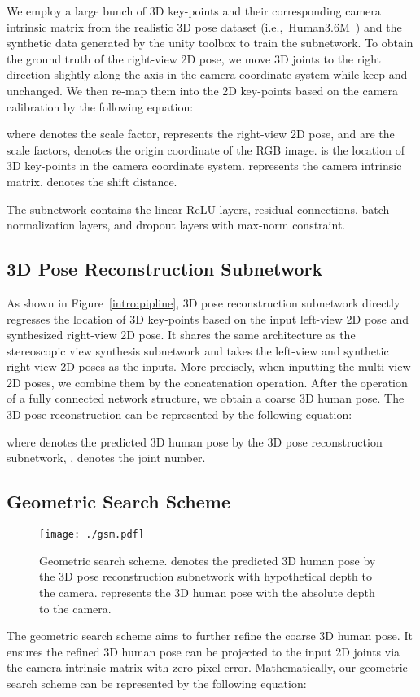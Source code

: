 \documentclass[10pt,twocolumn,letterpaper]{article}
\def\ie{i.e.,~}
\begin{document}
We employ a large bunch of 3D key-points and their corresponding camera intrinsic matrix from the realistic 3D pose dataset (\ie Human3.6M~\cite{h36m_pami}) and the synthetic data generated by the unity toolbox to train the subnetwork.
To obtain the ground truth of the right-view 2D pose, we move 3D joints to the right direction slightly along the  axis in the camera coordinate system while keep  and  unchanged. We then re-map them into the 2D key-points based on the camera calibration by the following equation:

where  denotes the scale factor,  represents the right-view 2D pose,  and  are the scale factors,  denotes the origin coordinate of the RGB image.  is the location of 3D key-points in the camera coordinate system.  represents the camera intrinsic matrix.  denotes the shift distance. 

The subnetwork contains the linear-ReLU layers, residual connections, batch normalization layers, and dropout layers with max-norm constraint.
\subsection{3D Pose Reconstruction Subnetwork}
As shown in Figure~\ref{intro:pipline}, 3D pose reconstruction subnetwork directly regresses the location of 3D key-points based on the input left-view 2D pose and synthesized right-view 2D pose.
It shares the same architecture as the stereoscopic view synthesis subnetwork and takes the left-view and synthetic right-view 2D poses as the inputs.
More precisely, when inputting the multi-view 2D poses, we combine them by the concatenation operation.
After the operation of a fully connected network structure, we obtain a coarse 3D human pose.
The 3D pose reconstruction can be represented by the following equation:

where  denotes the predicted 3D human pose by the 3D pose reconstruction subnetwork, ,  denotes the joint number. 
\subsection{Geometric Search Scheme}

\begin{figure}[t]
\footnotesize
\centering
\texttt{[image: ./gsm.pdf]}
\vspace{-2mm}
\caption{Geometric search scheme.  denotes the predicted 3D human pose by the 3D pose reconstruction subnetwork with hypothetical depth to the camera. 
 represents the 3D human pose with the absolute depth to the camera.}
\vspace{-6mm}
\label{meth:gsm}
\end{figure}
The geometric search scheme aims to further refine the coarse 3D human pose.
It ensures the refined 3D human pose can be projected to the input 2D joints via the camera intrinsic matrix with zero-pixel error.
Mathematically, our geometric search scheme can be represented by the following equation:
\end{document}
